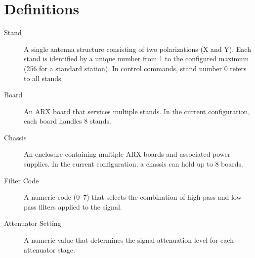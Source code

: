 \begin{longtable}{p{3cm}p{10cm}}
\end{longtable}

\section{Definitions}

\begin{description}
    \item[Stand] A single antenna structure consisting of two polarizations (X and Y). Each stand is identified by a unique number from 1 to the configured maximum (256 for a standard station). In control commands, stand number 0 refers to all stands.

    \item[Board] An ARX board that services multiple stands. In the current configuration, each board handles 8 stands.

    \item[Chassis] An enclosure containing multiple ARX boards and associated power supplies.  In the current configuration, a chassis can hold up to 8 boards.

    \item[Filter Code] A numeric code (0--7) that selects the combination of high-pass and low-pass filters applied to the signal.

    \item[Attenuator Setting] A numeric value that determines the signal attenuation level for each attenuator stage.
\end{description}
